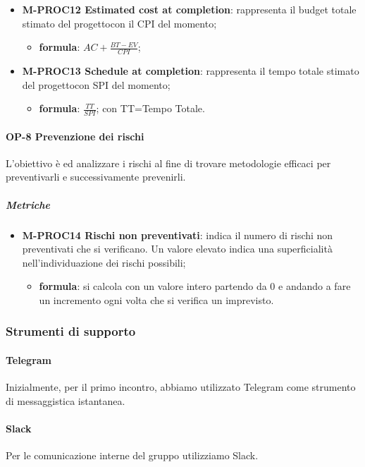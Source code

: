 \begin{itemize}
				\item \textbf{M-PROC12 Estimated cost at completion}: rappresenta il budget totale stimato del progetto\glosp con il CPI del momento;
				\begin{itemize}
					\item[] \textbf{formula}: $AC+\frac{BT-EV}{CPI}$; 
				\end{itemize} 
				
				\item \textbf{M-PROC13 Schedule at completion}: rappresenta il tempo totale stimato del progetto\glosp con SPI del momento;
				\begin{itemize}
					\item[] \textbf{formula}: $\frac{TT}{SPI}$; con TT=Tempo Totale. 
				\end{itemize} 
			\end{itemize}
		
			\paragraph{OP-8 Prevenzione dei rischi}
			L'obiettivo è ed analizzare i rischi al fine di trovare metodologie efficaci per preventivarli e successivamente prevenirli.
			\subparagraph{Metriche}
			\begin{itemize}
				\item \textbf{M-PROC14 Rischi non preventivati}: indica il numero di rischi non preventivati che si verificano. Un valore elevato indica una superficialità nell'individuazione dei rischi possibili;
				\begin{itemize}
					\item[] \textbf{formula}: si calcola con un valore intero partendo da 0 e andando a fare un incremento ogni volta che si verifica un imprevisto.
				\end{itemize}
			\end{itemize}
	\subsubsection{Strumenti di supporto}
			\paragraph{Telegram}
				Inizialmente, per il primo incontro, abbiamo utilizzato Telegram come strumento di messaggistica istantanea.
			\paragraph{Slack}
				Per le comunicazione interne del gruppo utilizziamo Slack.
